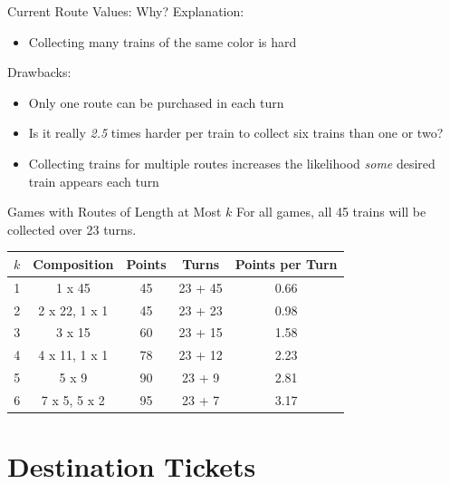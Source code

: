 \documentclass[12pt]{beamer}
\begin{document}
\begin{frame}{Current Route Values: Why?}
    Explanation: 
    \begin{itemize}
    \item Collecting many trains of the same 
    color is hard\footnotemark
    \end{itemize}
    \vspace{.5cm}
    \pause
    Drawbacks: 
    \begin{itemize}
    \item Only one route can be purchased in each turn
    \item Is it really \textit{2.5} times harder per train to 
    collect six trains than one or two?
    \item Collecting trains for multiple routes 
    increases the likelihood \textit{some} desired 
    train appears each turn
    \end{itemize}
\end{frame}

\begin{frame}{Games with Routes of Length at Most $k$}
    For all games, all 45 trains will be collected over 23 turns.\footnotemark[2]
    
    \vspace{.5cm}
    \renewcommand{\arraystretch}{1.5}
    \begin{tabular}{| c | c | c | c | c |}
    \hline
    $k$ & Composition & Points & Turns & Points per Turn\\
    \hline
    1 & 1 x 45 & 45 & 23 + 45 & 0.66\\
    \hline
    2 & 2 x 22, 1 x 1 & 45 & 23 + 23 & 0.98\\
    \hline
    3 & 3 x 15 & 60 & 23 + 15 & 1.58\\
    \hline
    4 & 4 x 11, 1 x 1 & 78 & 23 + 12 & 2.23\\
    \hline
    5 & 5 x 9 & 90 & 23 + 9 & 2.81\\
    \hline
    6 & 7 x 5, 5 x 2 & 95 & 23 + 7 & 3.17\\
    \hline
    \end{tabular}
\end{frame}

\section{Destination Tickets}
\end{document}
